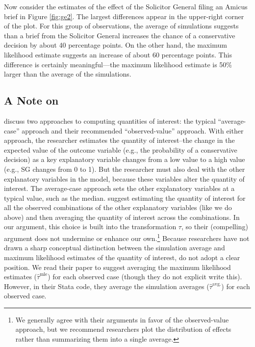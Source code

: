 \documentclass[10pt]{article}
\begin{document}
Now consider the estimates of the effect of the Solicitor General filing an Amicus brief in Figure \ref{fig:ge2}.
The largest differences appear in the upper-right corner of the plot.
For this group of observations, the average of simulations suggests than a brief from the Solicitor General increases the chance of a conservative decision by about 40 percentage points. 
On the other hand, the maximum likelihood estimate suggests an increase of about 60 percentage points. 
This difference is certainly meaningful---the maximum likelihood estimate is 50\% larger than the average of the simulations.

\subsection*{A Note on \cite{HanmerKalkan2013}}

\cite{HanmerKalkan2013} discuss two approaches to computing quantities of interest: the typical ``average-case'' approach and their recommended ``observed-value'' approach. 
With either approach, the researcher estimates the quantity of interest--the change in the expected value of the outcome variable (e.g., the probability of a conservative decision) as a key explanatory variable changes from a low value to a high value (e.g., SG changes from 0 to 1). 
But the researcher must also deal with the other explanatory variables in the model, because these variables alter the quantity of interest. 
The average-case approach sets the other explanatory variables at a typical value, such as the median. 
\cite{HanmerKalkan2013} suggest estimating the quantity of interest for all the observed combinations of the other explanatory variables (like we do above) and then averaging the quantity of interest across the combinations. 
In our argument, this choice is built into the transformation $\tau$, so their (compelling) argument does not undermine or enhance our own.\footnote{We generally agree with their arguments in favor of the observed-value approach, but we recommend researchers plot the distribution of effects rather than summarizing them into a single average.} 
Because researchers have not drawn a sharp conceptual distinction between the simulation average and maximum likelihood estimates of the quantity of interest, \cite{HanmerKalkan2013} do not adopt a clear position. 
We read their paper to suggest averaging the maximum likelihood estimates ($\hat{\tau}^\text{mle}$) for each observed case (though they do not explicit write this). 
However, in their Stata code, they average the simulation averages ($\hat{\tau}^\text{avg.}$) for each observed case.
\end{document}
